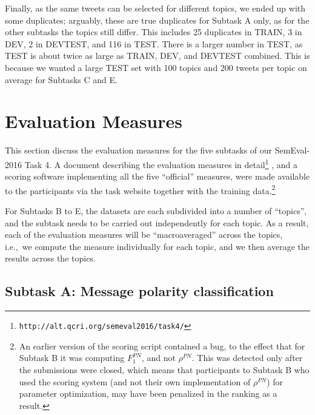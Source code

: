 \documentclass[11pt,letterpaper]{article}
\begin{document}
Finally, as the same tweets can be selected for different topics, we
ended up with some duplicates; arguably, these are true duplicates for
Subtask A only, as for the other subtasks the topics still
differ. This includes 25 duplicates in TRAIN, 3 in DEV, 2 in DEVTEST,
and 116 in TEST. There is a larger number in TEST, as TEST is about
twice as large as TRAIN, DEV, and DEVTEST combined. This is because we wanted a large
TEST set with 100 topics and 200 tweets per topic on average for
Subtasks C and E.


\section{Evaluation Measures}
\label{sec:scoring}

\noindent This section discuss the evaluation measures for the five subtasks of
our SemEval-2016 Task 4. A document describing
the evaluation measures in detail\footnote{\texttt{http://alt.qcri.org/semeval2016/task4/}} %
\cite{Nakov:2016kl}, and a scoring software implementing all the five
``official'' measures, were made available to the participants via the task website
together with the training data.\footnote{An earlier version of the
scoring script contained a bug, to the effect that for Subtask B it
was computing $F_1^{PN}$, and not $\rho^{PN}$. This was detected only
after the submissions were closed, which means that participants to
Subtask B who used the scoring system (and not their own
implementation of $\rho^{PN}$) for parameter optimization, may have
been penalized in the ranking as a result.}

For Subtasks B to E, the %
datasets are each subdivided into a number of ``topics'', and
the subtask needs to be carried out independently for each topic. As a
result, each of the evaluation measures will be
``macroaveraged'' across the topics, i.e.,~we compute the measure
individually for each topic, and we then average the results across
the topics.


\subsection{Subtask A: Message polarity classification}
\label{sec:4A}
\end{document}
